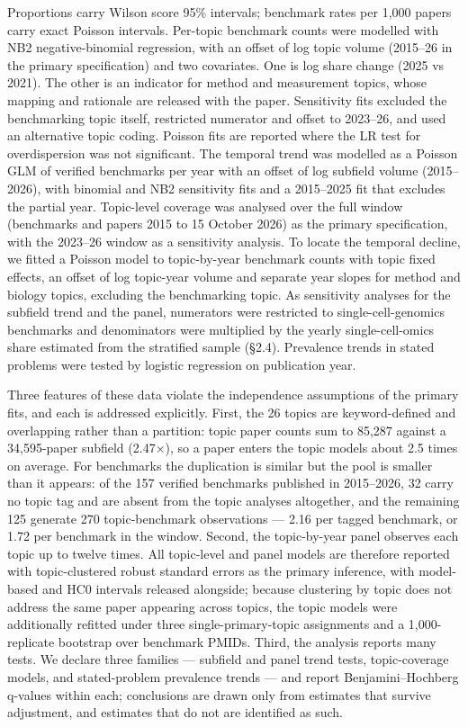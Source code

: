 \documentclass[11pt]{article}
\begin{document}
Proportions carry Wilson score 95\% intervals; benchmark rates per 1,000
papers carry exact Poisson intervals. Per-topic benchmark counts were
modelled with NB2 negative-binomial regression, with an offset of log
topic volume (2015--26 in the primary specification) and two covariates.
One is log share change (2025 vs 2021). The other is an indicator for
method and measurement topics, whose mapping and rationale are released
with the paper. Sensitivity fits excluded the benchmarking topic itself,
restricted numerator and offset to 2023--26, and used an alternative
topic coding. Poisson fits are reported where the LR test for
overdispersion was not significant. The temporal trend was modelled as a
Poisson GLM of verified benchmarks per year with an offset of log
subfield volume (2015--2026), with binomial and NB2 sensitivity fits and
a 2015--2025 fit that excludes the partial year. Topic-level coverage
was analysed over the full window (benchmarks and papers 2015 to 15
October 2026) as the primary specification, with the 2023--26 window as
a sensitivity analysis. To locate the temporal decline, we fitted a
Poisson model to topic-by-year benchmark counts with topic fixed
effects, an offset of log topic-year volume and separate year slopes for
method and biology topics, excluding the benchmarking topic. As
sensitivity analyses for the subfield trend and the panel, numerators
were restricted to single-cell-genomics benchmarks and denominators were
multiplied by the yearly single-cell-omics share estimated from the
stratified sample (§2.4). Prevalence trends in stated problems were
tested by logistic regression on publication year.

Three features of these data violate the independence assumptions of the
primary fits, and each is addressed explicitly. First, the 26 topics are
keyword-defined and overlapping rather than a partition: topic paper
counts sum to 85,287 against a 34,595-paper subfield (2.47×), so a paper
enters the topic models about 2.5 times on average. For benchmarks the
duplication is similar but the pool is smaller than it appears: of the
157 verified benchmarks published in 2015--2026, 32 carry no topic tag
and are absent from the topic analyses altogether, and the remaining 125
generate 270 topic-benchmark observations --- 2.16 per tagged benchmark,
or 1.72 per benchmark in the window. Second, the topic-by-year panel
observes each topic up to twelve times. All topic-level and panel models
are therefore reported with topic-clustered robust standard errors as
the primary inference, with model-based and HC0 intervals released
alongside; because clustering by topic does not address the same paper
appearing across topics, the topic models were additionally refitted
under three single-primary-topic assignments and a 1,000-replicate
bootstrap over benchmark PMIDs. Third, the analysis reports many tests.
We declare three families --- subfield and panel trend tests,
topic-coverage models, and stated-problem prevalence trends --- and
report Benjamini--Hochberg q-values within each; conclusions are drawn
only from estimates that survive adjustment, and estimates that do not
are identified as such.
\end{document}

